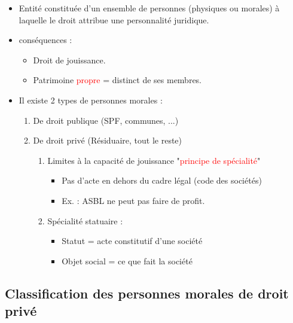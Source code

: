 \begin{itemize}
    \item Entité constituée d'un ensemble de personnes (physiques ou morales) à laquelle le droit attribue une personnalité juridique.
    \item conséquences :
    \begin{itemize}
        \item Droit de jouissance.
        \item Patrimoine \textcolor{red}{propre} = distinct de ses membres.
    \end{itemize}
    \item Il existe 2 types de personnes morales :
    \begin{enumerate}
        \item De droit publique (SPF, communes, ...)
        \item De droit privé (Résiduaire, tout le reste)
        \begin{enumerate}
            \item Limites à la capacité de jouissance "\textcolor{red}{principe de spécialité}"
            \begin{itemize}
                \item Pas d'acte en dehors du cadre légal (code des sociétés)
                \item Ex. : ASBL ne peut pas faire de profit.
            \end{itemize}
            \item Spécialité statuaire : 
            \begin{itemize}
                \item Statut = acte constitutif d'une société
                \item Objet social = ce que fait la société
            \end{itemize}
        \end{enumerate}
    \end{enumerate}
\end{itemize}

\subsection{Classification des personnes morales de droit privé}

